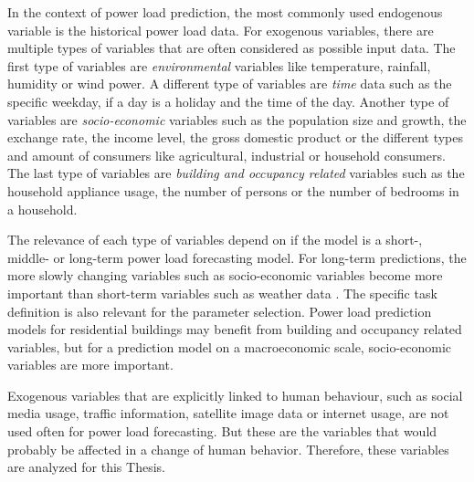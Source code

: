 In the context of power load prediction, the most commonly 
used endogenous variable is the historical power load data.
For exogenous variables, there are multiple types of 
variables that are often considered as possible input data.
The first type of variables are \textit{environmental} variables like temperature, 
rainfall, humidity or wind power. A different type of variables are \textit{time} data
such as the specific weekday, if a day is a holiday and the time of the day.
Another type of variables are \textit{socio-economic} variables such as the
population size and growth, the exchange rate, the income level,
the gross domestic product or the different types and amount 
of consumers like agricultural, industrial or household consumers.
The last type of variables are \textit{building and occupancy related} variables such
as the household appliance usage,
the number of persons or the number of bedrooms in a household.

The relevance of each type of variables depend on if the model is
a short-, middle- or long-term power load forecasting model. For 
long-term predictions, the more slowly changing variables such as socio-economic
variables become more important than short-term variables such as weather data 
\cite{loadforecastingtimedependency2}\cite{loadforecastingtimedependency}.
The specific task definition is also relevant for the parameter selection.
Power load prediction models for residential buildings may benefit from 
building and occupancy related variables, but for a prediction model on a 
macroeconomic scale, socio-economic variables are more important.

Exogenous variables that are explicitly linked to human behaviour, 
such as social media usage, traffic information, satellite image data or 
internet usage, are not used often for power load forecasting. 
But these are the variables that would probably be affected in a change of 
human behavior. Therefore, these variables are analyzed for this Thesis.

